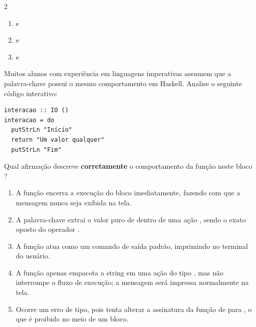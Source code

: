 \documentclass[a4paper,10pt,brazil]{article}
\begin{document}
\begin{multicols}{2}
\begin{enumerate}
  \item {} e 

  \item {} e 

  \item {} e 


\end{enumerate}

Muitos alunos com experiência em linguagens imperativas assumem que a palavra-chave  possui o mesmo comportamento em Haskell. Analise o seguinte código interativo:

\begin{verbatim}
interacao :: IO ()
interacao = do
  putStrLn "Início"
  return "Um valor qualquer"
  putStrLn "Fim"
\end{verbatim}

Qual afirmação descreve \textbf{corretamente} o comportamento da função  neste bloco ?

\begin{enumerate}
  \item A função  encerra a execução do bloco  imediatamente, fazendo com que a mensagem  nunca seja exibida na tela.

  \item A palavra-chave  extrai o valor puro de dentro de uma ação , sendo o exato oposto do operador \haskellinline{<-}.

  \item A função  atua como um comando de saída padrão, imprimindo  no terminal do usuário.

  \item A função  apenas empacota a string em uma ação do tipo , mas não interrompe o fluxo de execução; a mensagem  será impressa normalmente na tela.

  \item Ocorre um erro de tipo, pois  tenta alterar a assinatura da função de  para , o que é proibido no meio de um bloco.


\end{enumerate}


\end{multicols}
\end{document}

